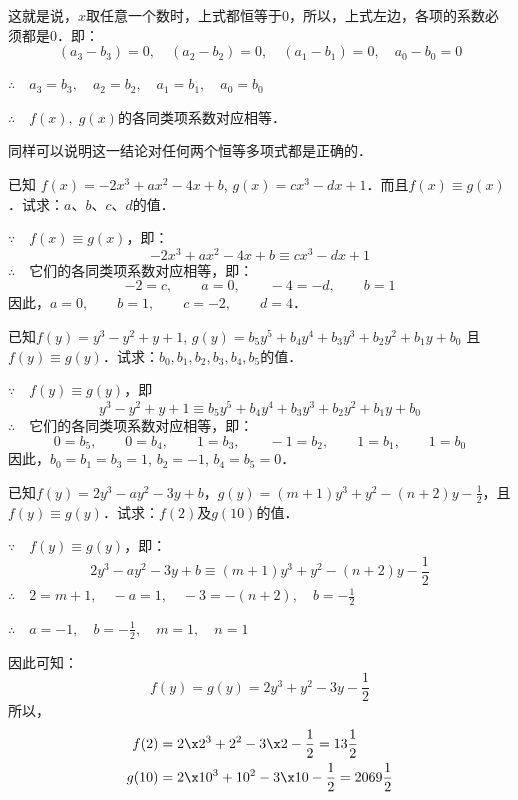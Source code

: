这就是说，$x$取任意一个数时，上式都恒等于0，所以，上式左边，各项的系数必须都是0．即：
\[(a_3-b_3)=0,\quad (a_2-b_2)=0,\quad (a_1-b_1)=0,\quad a_0 -b_0= 0  \]

$\therefore\quad a_3=b_3,\quad a_2=b_2,\quad a_1=b_1,\quad a_0=b_0$

$\therefore\quad f(x),\; g(x)$的各同类项系数对应相等．

同样可以说明这一结论对任何两个恒等多项式都是正确的．

\begin{example}
    已知 $f(x)=-2x^3+ax^2-4x+b$, $g(x)=cx^3-dx+1$．而且$f(x)\equiv g(x)$．试求：$a$、$b$、$c$、$d$的值．
\end{example}

\begin{solution}
    $\because\quad f(x)\equiv g(x)$，即：
\[-2x^3+ax^2-4x+b\equiv cx^3-dx+1\]
$\therefore\quad $它们的各同类项系数对应相等，即： 
\[-2=c,\qquad a=0,\qquad -4=-d,\qquad b=1\]
因此，$a=0,\qquad b=1,\qquad c=-2,\qquad d=4$．
\end{solution}

\begin{example}
    已知$f(y)=y^3-y^2+y+1$, $g(y)=b_5y^5+b_4y^4+b_3y^3+b_2y^2+b_1y+b_0$ 且$f(y)\equiv g(y)$．试求：$b_0,b_1,b_2,b_3,b_4,b_5$的值．
\end{example}


\begin{solution}
$\because\quad f(y)\equiv g(y)$，即
\[y^3-y^2+y+1\equiv b_5y^5+b_4y^4+b_3y^3+b_2y^2+b_1y+b_0 \]
$\therefore\quad $它们的各同类项系数对应相等，即：
\[0=b_5,\qquad 0=b_4,\qquad 1=b_3,\qquad -1=b_2,\qquad 1=b_1,\qquad
1=b_0\]
 因此，$b_0=b_1=b_3=1$, $b_2=-1$, $b_4=b_5=0$．   
\end{solution}

\begin{example}
   已知$f(y)=2y^3-ay^2-3y+b$，$g(y)=(m+1)y^3+y^2-(n+2)y-\frac{1}{2}$，且$f(y)\equiv g(y)$．试求：$f(2)$及$g(10)$的值． 
\end{example}

\begin{solution}
$\because\quad f(y)\equiv g(y)$，即：
\[2y^3-ay^2-3y+b\equiv (m+1)y^3+y^2-(n+2)y-\frac{1}{2} \]
$\therefore\quad 2=m+1,\quad -a=1,\quad -3=-(n+2),\quad b=-\frac{1}{2}$

$\therefore\quad a=-1,\quad b=-\frac{1}{2},\quad m=1,\quad n=1$

因此可知：
\[f(y)=g(y)=2y^3+y^2-3y-\frac{1}{2} \]
所以，
\[\begin{split}
    f(2)&= 2\x 2^3+2^2-3\x 2-\frac{1}{2}=13\frac{1}{2}\\
    g(10)&=2\x 10^3+10^2-3\x 10-\frac{1}{2}=2069\frac{1}{2} 
\end{split}\]
\end{solution}

